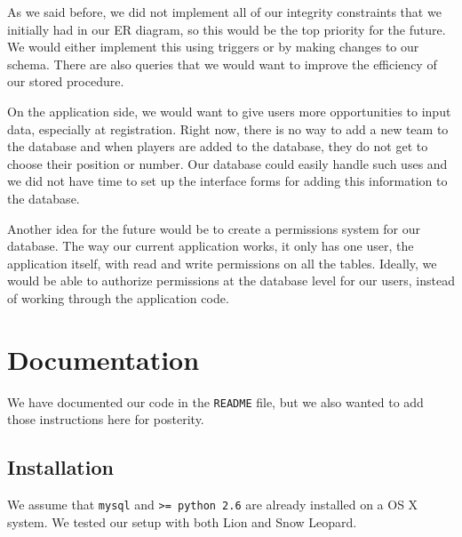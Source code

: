\documentclass{article}
\begin{document}
As we said before, we did not implement all of our integrity constraints that we initially had in our ER diagram, so this would be the top priority for the future.  We would either implement this using triggers or by making changes to our schema.  There are also queries that we would want to improve the efficiency of our stored procedure. 

On the application side, we would want to give users more opportunities to input data, especially at registration.  Right now, there is no way to add a new team to the database and when players are added to the database, they do not get to choose their position or number.  Our database could easily handle such uses and we did not have time to set up the interface forms for adding this information to the database.

Another idea for the future would be to create a permissions system for our database.  The way our current application works, it only has one user, the application itself, with read and write permissions on all the tables.   Ideally, we would be able to authorize permissions at the database level for our users, instead of working through the application code.


\section*{Documentation}

We have documented our code in the {\tt README} file, but we also wanted to add
those instructions here for posterity. 

\subsection*{Installation}

We assume that {\tt mysql} and {\tt >= python 2.6} are already installed on a 
OS X system. We tested our setup with both Lion and Snow Leopard. 
\end{document}
